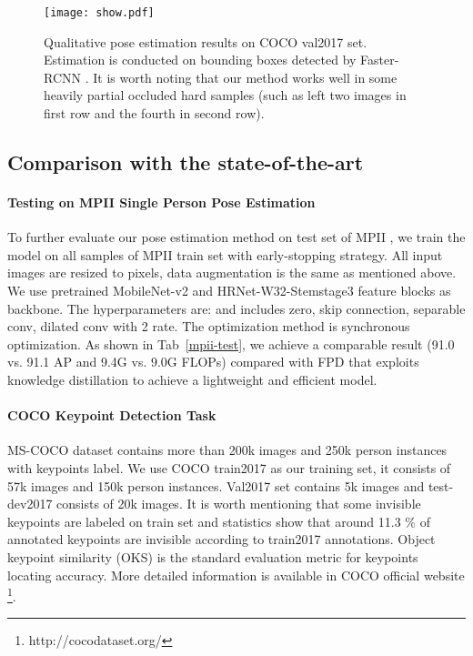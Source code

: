 \documentclass[journal]{IEEEtran}
\begin{document}
\begin{figure*}
	
	\centering
\texttt{[image: show.pdf]}
	\caption{Qualitative pose estimation results on COCO val2017 set. Estimation is conducted on bounding boxes detected by Faster-RCNN \cite{ren2015faster}. It is worth noting that our method works well in some heavily partial occluded hard samples (such as left two images in first row and the fourth in second row).
	}
	
	\label{coco_results}
\end{figure*}

\subsection{Comparison with the state-of-the-art}
\label{state-of-the-art}
\paragraph{Testing on MPII Single Person Pose Estimation} To further evaluate our pose estimation method on test set of MPII \cite{andriluka20142d}, we train the model on all samples of MPII train set with early-stopping strategy. All input images are resized to  pixels, data augmentation is the same as mentioned above. We use pretrained MobileNet-v2 and HRNet-W32-Stemstage3 feature blocks as backbone. The hyperparameters are:  and  includes zero, skip connection,  separable conv,  dilated conv with 2 rate. The optimization method is synchronous optimization. As shown in Tab~\ref{mpii-test}, we achieve a comparable result (91.0 vs. 91.1 AP and 9.4G vs. 9.0G FLOPs) compared with FPD \cite{Zhang2018FastHP} that exploits knowledge distillation to achieve a lightweight and efficient model.

\paragraph{COCO Keypoint Detection Task} MS-COCO \cite{lin2014microsoft} dataset contains more than 200k images and 250k person instances with keypoints label. We use COCO train2017 as our training set, it consists of 57k images and 150k person instances. Val2017 set contains 5k images and test-dev2017 consists of 20k images. It is worth mentioning that some invisible keypoints are labeled on train set and statistics show that around 11.3 \% of annotated keypoints are invisible according to train2017 annotations. Object keypoint similarity (OKS) is the standard evaluation metric for keypoints locating accuracy. More detailed information is available in COCO official website \footnote{http://cocodataset.org/}.  
\end{document}

